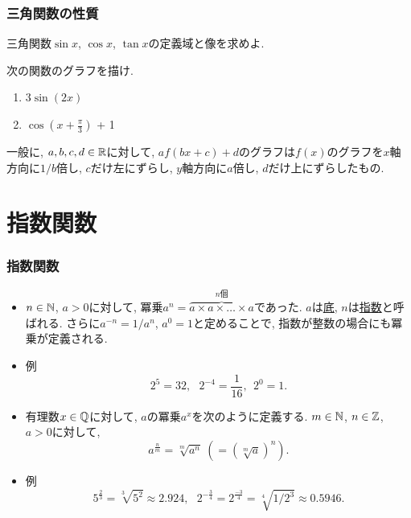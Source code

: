 



\begin{frame}
\frametitle{三角関数の性質}

\begin{Prob}
三角関数$\sin x$, $\cos x$, $\tan x$の定義域と像を求めよ.  
\end{Prob}

\begin{Prob}
次の関数のグラフを描け. 
\begin{enumerate}
\item $3\sin(2x)$
\item $\cos(x+\frac{\pi}{3})$ + 1
\end{enumerate}
\end{Prob}

一般に, $a,b,c,d \in \mathbb{R}$に対して, $af(bx+c)+d$のグラフは$f(x)$のグラフを$x$軸方向に$1/b$倍し, $c$だけ左にずらし, $y$軸方向に$a$倍し, $d$だけ上にずらしたもの. 
\end{frame}



\section{指数関数}


\begin{frame}
\frametitle{指数関数}

\begin{itemize}
\item  $n\in \mathbb{N}$, $a >0$に対して, 冪乗$a^n =\overbrace{ a \times a \times \dots \times a}^\text{$n$個}$であった. 
$a$は\underline{底}, $n$は\underline{指数}と呼ばれる. 
さらに$a^{-n}=1/a^n$, $a^0=1$と定めることで, 指数が整数の場合にも冪乗が定義される. 
\item 例
$$
2^5=32, \ \ \ 2^{-4}=\frac{1}{16}, \ \ 2^0=1. 
$$
\item 有理数$x \in \mathbb{Q}$に対して, $a$の冪乗$a^x$を次のように定義する. 
$m \in \mathbb{N}$, $n\in \mathbb{Z}$, $a>0$に対して, 
$$
a^{\frac{n}{m}}=\sqrt[m]{a^n} \ (=(\sqrt[m]{a})^n). 
$$
\item 例
$$
5^{\frac{2}{3}}=\sqrt[3]{5^2} \approx 2.924,  \ \ \ 2^{-\frac{3}{4}}=2^{\frac{-3}{4}}=\sqrt[4]{1/2^3} \approx 0.5946.  
$$
\end{itemize}



\end{frame}


